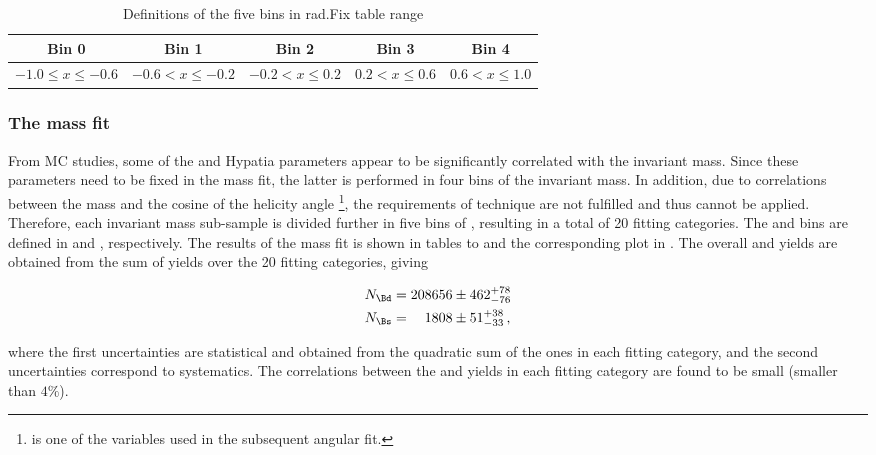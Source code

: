 \begin{table}[!h]
\begin{tabular}{c|c|c|c|c}
\hline
 Bin 0 & Bin 1 & Bin 2 & Bin 3 & Bin 4\\	
\hline
\multirow{2}{*}{$ -1.0 \leq x \leq -0.6 $} & \multirow{2}{*}{$ -0.6 < x \leq -0.2 $} & \multirow{2}{*}{$ -0.2 < x \leq 0.2 $}& \multirow{2}{*}{$ 0.2 < x \leq 0.6 $} & \multirow{2}{*}{$ 0.6 < x \leq 1.0 $} \\
					      	 					  &   &	& & \\	
\hline
 \end{tabular}
\caption{Definitions of the five \cosTmu bins in rad.{\color{red}Fix table range}}
\label{cosThateMubindef} 
\end{table}

\subsubsection{The mass fit}
From MC studies, some of the \Bs and \Bd Hypatia parameters appear to be significantly correlated with the \mkpi invariant mass. 
Since these parameters need to be fixed in the mass fit, the latter is performed in four bins of the
\mkpi invariant mass. In addition, due to correlations between the mass and the cosine of the helicity angle \thetamu\footnote{\cosTmu is one of 
the variables used in the subsequent angular fit.},
the requirements of \sPlot technique are not fulfilled and thus cannot be applied. Therefore, each \mkpi invariant mass sub-sample
is divided further in five bins of \cosTmu, resulting in a total of 20 fitting categories. The \mkpi and \cosTmu bins are defined 
in  and , respectively. The results of the mass fit is shown in tables 
to  and the corresponding plot in . The overall \Bs and \Bd yields are obtained from the sum 
of yields over the 20 fitting categories, giving

\begin{align}
N_{\Bd} &= 208656  \pm  462 ^{+ 78	}_{- 76}\\
N_{\Bs} &= \phantom{00}1808  \pm   51 ^{+ 38	}_{- 33} \, ,
\end{align}

\noindent where the first uncertainties are statistical and obtained from the quadratic sum of the ones in each fitting category, 
and the second uncertainties correspond to systematics. The correlations between the \Bd and \Bs yields in each fitting category
are found to be small (smaller than $4\%$).

